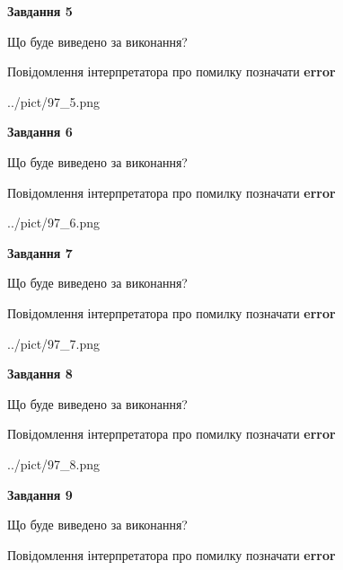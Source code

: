 \documentclass[11pt, ukrainian]{article}
\begin{document}
{\begin {large}
{\begin {center}\textbf{Завдання 5}\end {center}}\par
Що буде виведено за виконання? \par
Повідомлення інтерпретатора про помилку позначати \textbf{error}

\begin{center}
	{../pict/97_5.png}
\end{center}
\newpage

{\begin {center}\textbf{Завдання 6}\end {center}}\par
Що буде виведено за виконання? \par
Повідомлення інтерпретатора про помилку позначати \textbf{error}

\begin{center}
	{../pict/97_6.png}
\end{center}
\newpage

{\begin {center}\textbf{Завдання 7}\end {center}}\par
Що буде виведено за виконання? \par
Повідомлення інтерпретатора про помилку позначати \textbf{error}

\begin{center}
	{../pict/97_7.png}
\end{center}
\newpage

{\begin {center}\textbf{Завдання 8}\end {center}}\par
Що буде виведено за виконання? \par
Повідомлення інтерпретатора про помилку позначати \textbf{error}

\begin{center}
	{../pict/97_8.png}
\end{center}
\newpage

{\begin {center}\textbf{Завдання 9}\end {center}}\par
Що буде виведено за виконання? \par
Повідомлення інтерпретатора про помилку позначати \textbf{error}


\end{large}}
\end{document}
